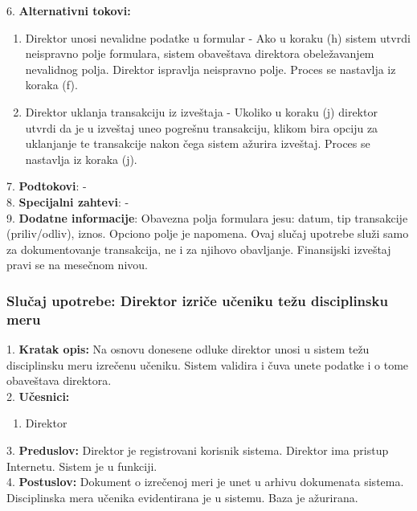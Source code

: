 \documentclass{article}
\begin{document}
6. \textbf{Alternativni tokovi:} 
\begin{enumerate} [label=(\roman*)]
\item Direktor unosi nevalidne podatke u formular - Ako u koraku (h) sistem utvrdi neispravno polje formulara, sistem obaveštava direktora obeležavanjem nevalidnog polja. Direktor ispravlja neispravno polje. Proces se nastavlja iz koraka (f).
\item Direktor uklanja transakciju iz izveštaja - Ukoliko u koraku (j) direktor utvrdi da je u izveštaj uneo pogrešnu transakciju, klikom bira opciju za uklanjanje te transakcije nakon čega sistem ažurira izveštaj. Proces se nastavlja iz koraka (j).  
\end{enumerate}

7. \textbf{Podtokovi}:  - \\

8. \textbf{Specijalni zahtevi}: - \\

9. \textbf{Dodatne informacije}: Obavezna polja formulara jesu: datum, tip transakcije (priliv/odliv), iznos. Opciono polje je napomena. Ovaj slučaj upotrebe služi samo za dokumentovanje transakcija, ne i za njihovo obavljanje. Finansijski izveštaj pravi se na mesečnom nivou.  \\


\subsubsection{Slučaj upotrebe: Direktor izriče učeniku težu disciplinsku meru}
1. \textbf{Kratak opis:} Na osnovu donesene odluke direktor unosi u sistem težu disciplinsku meru izrečenu učeniku. Sistem validira i čuva unete podatke i o tome obaveštava direktora. \\

2. \textbf{Učesnici:}
\begin{enumerate} [label=(\alph*)]
\item Direktor
\end{enumerate} 

3. \textbf{Preduslov:} Direktor je registrovani korisnik sistema. Direktor ima pristup Internetu. Sistem je u funkciji. \\

4. \textbf{Postuslov:} Dokument o izrečenoj meri je unet u arhivu dokumenata sistema. Disciplinska mera učenika evidentirana je u sistemu. Baza je ažurirana. \\
\end{document}
